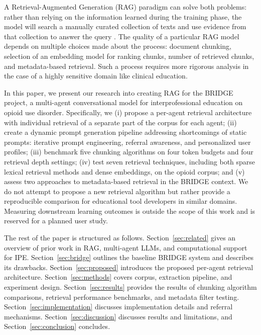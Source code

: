 \documentclass[pdflatex,sn-mathphys-num]{sn-jnl}
\theoremstyle{thmstyleone}
\theoremstyle{thmstyletwo}
\theoremstyle{thmstylethree}
\begin{document}
A Retrieval-Augmented Generation (RAG) paradigm can solve both problems: rather than relying on the information learned during the training phase, the model will search a manually curated collection of texts and use evidence from that collection to answer the query \cite{lewis2020rag,gao2023ragsurvey}. The quality of a particular RAG model depends on multiple choices made about the process: document chunking, selection of an embedding model for ranking chunks, number of retrieved chunks, and metadata-based retrieval. Such a process requires more rigorous analysis in the case of a highly sensitive domain like clinical education.

In this paper, we present our research into creating RAG for the BRIDGE project, a multi-agent conversational model for interprofessional education on opioid use disorder. Specifically, we (i) propose a per-agent retrieval architecture with individual retrieval of a separate part of the corpus for each agent; (ii) create a dynamic prompt generation pipeline addressing shortcomings of static prompts: iterative prompt engineering, referral awareness, and personalized user profiles; (iii) benchmark five chunking algorithms on four token budgets and four retrieval depth settings; (iv) test seven retrieval techniques, including both sparse lexical retrieval methods and dense embeddings, on the opioid corpus; and (v) assess two approaches to metadata-based retrieval in the BRIDGE context. We do not attempt to propose a new retrieval algorithm but rather provide a reproducible comparison for educational tool developers in similar domains. Measuring downstream learning outcomes is outside the scope of this work and is reserved for a planned user study.

The rest of the paper is structured as follows. Section~\ref{sec:related} gives an overview of prior work in RAG, multi-agent LLMs, and computational support for IPE. Section~\ref{sec:bridge}  outlines the baseline BRIDGE system and describes its drawbacks. Section~\ref{sec:proposed} introduces the proposed per-agent retrieval architecture. Section~\ref{sec:methods} covers corpus, extraction pipeline, and experiment design. Section~\ref{sec:results} provides the results of chunking algorithm comparisons, retrieval performance benchmarks, and metadata filter testing. Section~\ref{sec:implementation} discusses implementation details and referral mechanisms. Section~\ref{sec:discussion} discusses results and limitations, and Section~\ref{sec:conclusion} concludes.

\end{document}
